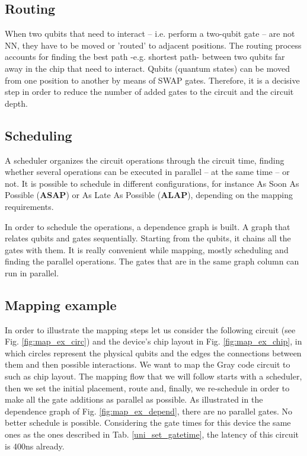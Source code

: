 \subsection{Routing}
\label{sec:org482e1ff}

When two qubits that need to interact -- i.e. perform a two-qubit gate -- are not NN, they have to be moved or 'routed' to adjacent positions.
The routing process accounts for finding the best path -e.g. shortest path- between two qubits far away in the chip that need to interact.
Qubits (quantum states) can be moved from one position to another by means of SWAP gates.
Therefore, it is a decisive step in order to reduce the number of added gates to the circuit and the circuit depth.

\subsection{Scheduling}
\label{sec:org8b954ea}

A scheduler organizes the circuit operations through the circuit time,
finding whether several operations can be executed in parallel -- at the same time -- or not.
It is possible to schedule in different configurations, for instance As Soon As Possible (\textbf{ASAP}) or As Late As Possible (\textbf{ALAP}), depending on the mapping requirements.

In order to schedule the operations, a dependence graph is built.  A graph that relates qubits and gates sequentially.
Starting from the qubits, it chains all the gates with them.
It is really convenient while mapping, mostly scheduling and finding the parallel operations.
The gates that are in the same graph column can run in parallel.
\subsection{Mapping example}
\label{sec:org9c31051}


In order to illustrate the mapping steps let us consider the following circuit (see Fig. \ref{fig:map_ex_circ}) and the device's chip layout in Fig. \ref{fig:map_ex_chip}, in which circles represent the physical qubits and the edges the connections between them and then possible interactions.  We want to map the Gray code circuit to such as chip layout.
The mapping flow that we will follow starts with a scheduler, then we set the initial placement, route and, finally, we re-schedule in order to make all the gate additions as parallel as possible.
As illustrated in the dependence graph of Fig. \ref{fig:map_ex_depend}, there are no parallel gates.
No better schedule is possible.
Considering the gate times for this device the same ones as the ones described in Tab. \ref{uni_set_gatetime}, the latency of this circuit is 400ns already.


